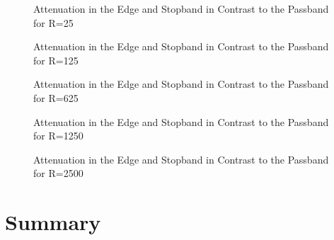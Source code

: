 \begin{figure}
    \centering
    
    \caption[Attenuation in the Edge and Stopband in Contrast to the Passband for R=25]{%
    Attenuation in the Edge and Stopband in Contrast to the Passband for R=25%
    }
    \label{fig:verification:fB25}
\end{figure}

\begin{figure}
    \centering
    
    \caption[Attenuation in the Edge and Stopband in Contrast to the Passband for R=125]{%
    Attenuation in the Edge and Stopband in Contrast to the Passband for R=125%
    }
    \label{fig:verification:fB125}
\end{figure}

\begin{figure}
    \centering
    
    \caption[Attenuation in the Edge and Stopband in Contrast to the Passband for R=625]{%
    Attenuation in the Edge and Stopband in Contrast to the Passband for R=625%
    }
    \label{fig:verification:fB625}
\end{figure}

\begin{figure}
    \centering
    
    \caption[Attenuation in the Edge and Stopband in Contrast to the Passband for R=1250]{%
    Attenuation in the Edge and Stopband in Contrast to the Passband for R=1250%
    }
    \label{fig:verification:fB5}
\end{figure}

\begin{figure}
    \centering
    
    \caption[Attenuation in the Edge and Stopband in Contrast to the Passband for R=2500]{%
    Attenuation in the Edge and Stopband in Contrast to the Passband for R=2500%
    }
    \label{fig:verification:fB5}
\end{figure}

%
%
\section{Summary} %
\label{sec:verification:summary}

